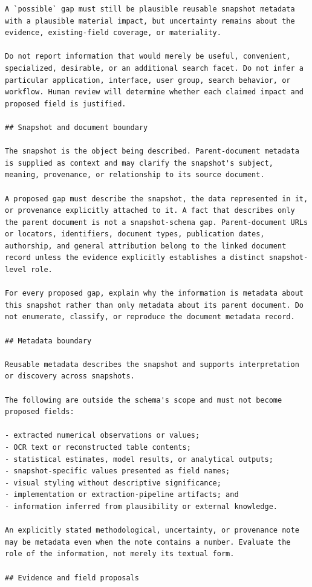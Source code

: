\documentclass{article}
\begin{document}
\begin{lstlisting}
A `possible` gap must still be plausible reusable snapshot metadata with a plausible material impact, but uncertainty remains about the evidence, existing-field coverage, or materiality.

Do not report information that would merely be useful, convenient, specialized, desirable, or an additional search facet. Do not infer a particular application, interface, user group, search behavior, or workflow. Human review will determine whether each claimed impact and proposed field is justified.

## Snapshot and document boundary

The snapshot is the object being described. Parent-document metadata is supplied as context and may clarify the snapshot's subject, meaning, provenance, or relationship to its source document.

A proposed gap must describe the snapshot, the data represented in it, or provenance explicitly attached to it. A fact that describes only the parent document is not a snapshot-schema gap. Parent-document URLs or locators, identifiers, document types, publication dates, authorship, and general attribution belong to the linked document record unless the evidence explicitly establishes a distinct snapshot-level role.

For every proposed gap, explain why the information is metadata about this snapshot rather than only metadata about its parent document. Do not enumerate, classify, or reproduce the document metadata record.

## Metadata boundary

Reusable metadata describes the snapshot and supports interpretation or discovery across snapshots.

The following are outside the schema's scope and must not become proposed fields:

- extracted numerical observations or values;
- OCR text or reconstructed table contents;
- statistical estimates, model results, or analytical outputs;
- snapshot-specific values presented as field names;
- visual styling without descriptive significance;
- implementation or extraction-pipeline artifacts; and
- information inferred from plausibility or external knowledge.

An explicitly stated methodological, uncertainty, or provenance note may be metadata even when the note contains a number. Evaluate the role of the information, not merely its textual form.

## Evidence and field proposals


\end{lstlisting}
\end{document}

